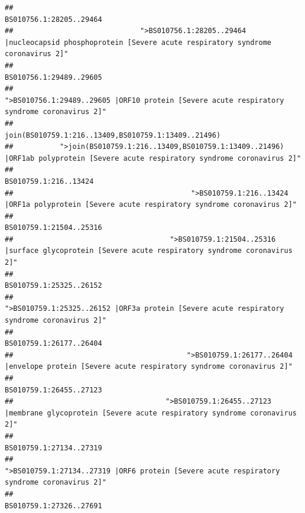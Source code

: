 \documentclass[
]{article}
\begin{document}
\begin{verbatim}
##                                                                                                                BS010756.1:28205..29464 
##                              ">BS010756.1:28205..29464 |nucleocapsid phosphoprotein [Severe acute respiratory syndrome coronavirus 2]" 
##                                                                                                                BS010756.1:29489..29605 
##                                            ">BS010756.1:29489..29605 |ORF10 protein [Severe acute respiratory syndrome coronavirus 2]" 
##                                                                                    join(BS010759.1:216..13409,BS010759.1:13409..21496) 
##           ">join(BS010759.1:216..13409,BS010759.1:13409..21496) |ORF1ab polyprotein [Severe acute respiratory syndrome coronavirus 2]" 
##                                                                                                                  BS010759.1:216..13424 
##                                          ">BS010759.1:216..13424 |ORF1a polyprotein [Severe acute respiratory syndrome coronavirus 2]" 
##                                                                                                                BS010759.1:21504..25316 
##                                     ">BS010759.1:21504..25316 |surface glycoprotein [Severe acute respiratory syndrome coronavirus 2]" 
##                                                                                                                BS010759.1:25325..26152 
##                                            ">BS010759.1:25325..26152 |ORF3a protein [Severe acute respiratory syndrome coronavirus 2]" 
##                                                                                                                BS010759.1:26177..26404 
##                                         ">BS010759.1:26177..26404 |envelope protein [Severe acute respiratory syndrome coronavirus 2]" 
##                                                                                                                BS010759.1:26455..27123 
##                                    ">BS010759.1:26455..27123 |membrane glycoprotein [Severe acute respiratory syndrome coronavirus 2]" 
##                                                                                                                BS010759.1:27134..27319 
##                                             ">BS010759.1:27134..27319 |ORF6 protein [Severe acute respiratory syndrome coronavirus 2]" 
##                                                                                                                BS010759.1:27326..27691 

\end{verbatim}
\end{document}
